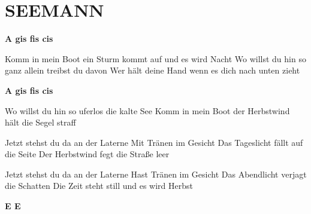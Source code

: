 \documentclass[../../../songbook.tex]{subfiles}
\begin{document}
\TabPositions{10cm} %
\section*{SEEMANN}
{}
\vspace{0.5cm}
{\color{red}\textbf{A gis fis cis} } \newline
 
Komm in mein Boot ein Sturm kommt auf und es wird Nacht 	 \newline
Wo willst du hin so ganz allein treibst du davon			\newline
Wer hält deine Hand wenn es dich nach unten zieht			\newline
 
{\color{red}\textbf{A gis fis cis} } \newline

Wo willst du hin so uferlos die kalte See			\newline
Komm in mein Boot der Herbstwind hält die Segel straff			\newline

\-\hspace{1cm} Jetzt stehst du da an der Laterne  \newline
\-\hspace{1cm} Mit Tränen im Gesicht		 \newline
\-\hspace{1cm} Das Tageslicht fällt auf die Seite			\newline
\-\hspace{1cm} Der Herbstwind fegt die Straße leer			\newline
 
\-\hspace{1cm} Jetzt stehst du da an der Laterne			\newline
\-\hspace{1cm} Hast Tränen im Gesicht			\newline
\-\hspace{1cm} Das Abendlicht verjagt die Schatten			\newline
\-\hspace{1cm} Die Zeit steht still und es wird Herbst			\newline

{\color{red}\textbf{E E } } \newline
 
\end{document}
